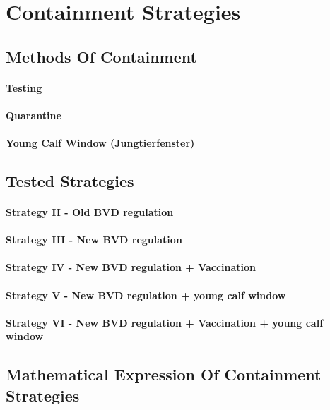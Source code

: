 \section{Containment Strategies}
\subsection{Methods Of Containment}
\paragraph{Testing}
\paragraph{Quarantine}
\paragraph{Young Calf Window (Jungtierfenster)}
\subsection{Tested Strategies}
\paragraph{Strategy II - Old BVD regulation}
\paragraph{Strategy III - New BVD regulation}
\paragraph{Strategy IV - New BVD regulation + Vaccination}
\paragraph{Strategy V - New BVD regulation + young calf window}
\paragraph{Strategy VI - New BVD regulation + Vaccination + young calf window} 
\subsection{Mathematical Expression Of Containment Strategies}